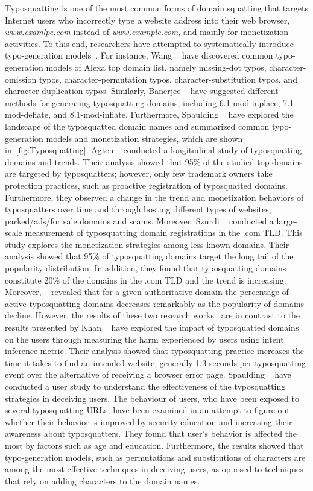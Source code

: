 Typosquatting is one of the most common forms of domain squatting that targets Internet users who incorrectly type a website address into their web browser, \eg \textit{www.examlpe.com} instead of \textit{www.example.com}, and mainly for monetization activities. To this end, researchers have attempted to systematically introduce typo-generation models~. For instance, Wang \etal~ have discovered common typo-generation models of Alexa top domain list, namely missing-dot typos, character-omission typos, character-permutation typos, character-substitution typos, and character-duplication typos. Similarly, Banerjee \etal~ have suggested different methods for generating typosquatting domains, including 6.1-mod-inplace, 7.1-mod-deflate, and 8.1-mod-inflate. Furthermore, Spaulding \etal~ have explored the landscape of the typosquatted domain names and summarized common typo-generation models and  monetization strategies, which are shown in~\autoref{fig:Typosquatting}.
Agten \etal~ conducted a longitudinal study of typosquatting domains and trends. Their analysis showed that 95\% of the studied top domains are targeted by typosquatters; however, only few trademark owners take protection practices, such as proactive registration of typosquatted domains. Furthermore, they observed a change in the trend and monetization behaviors of typosquatters over time and through hosting different types of websites, \eg parked/ads/for sale domains and scams. 
Moreover, Szurdi \etal~ conducted a large-scale measurement of typosquatting domain registrations in the .com TLD. This study explores the monetization strategies among less known domains. Their analysis showed that 95\% of typosquatting domains target the long tail of the popularity distribution. In addition, they found that typosquatting domains constitute 20\% of the domains in the .com TLD and the trend is increasing. Moreover, \etal~ revealed that for a given authoritative domain the percentage of active typosquatting domains decreases remarkably as the popularity of domains decline. 
However, the results of these two research works~ are in contrast to the results presented by 
Khan \etal~ have explored the impact of typosquatted domains on the users through measuring the harm experienced by users using intent inference metric. Their analysis showed that typosquatting practice increases the time it takes to find an intended website, generally 1.3 seconds per typosquatting event over the alternative of receiving a browser error page. 
Spaulding \etal~ have conducted a user study to understand the effectiveness of the typosquatting strategies in deceiving users. The behaviour of users, who have been exposed to several typosquatting URLs, have been examined in an attempt to figure out whether their behavior is improved by security education and increasing their awareness about typosquatters. They found that user's behavior is affected the most by factors such as age and education. Furthermore, the results showed that typo-generation models, such as permutations and substitutions of characters are among the most effective techniques in deceiving users, as opposed to techniques that rely on adding characters to the domain names.
